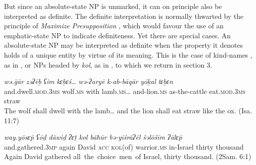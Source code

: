\documentclass[output=paper]{langsci/langscibook}
\begin{document}
But since an absolute-state NP is unmarked, it can on principle also be interpreted as definite. The definite interpretation is normally thwarted by the principle of \textit{Maximize} \textit{Presupposition} \citep{Heim1991}, which would favour the use of an emphatic-state NP to indicate definiteness. Yet there are special cases. An absolute-state NP may be interpreted as definite when the property it denotes holds of a unique entity by virtue of its meaning. This is the case of kind-names \citep{Doron2003}, as in , or NPs headed by \textit{kol}, as in , to which we return in section 3.

\ea%
    \label{ex:doron:5}
    \gll \textit{wə.ḡār}                        \textit{zəʔēḇ}      \textit{ʕim}  \textit{kɛḇɛś…}       \textit{wə-ʔaryē}        \textit{k-ab-bāqār}   \textit{yōḵal}              \textit{tɛḇɛn}\\
         and.dwell.\textsc{mod.3ms}   wolf.\textsc{ms}  with lamb.\textsc{ms}… and-lion\textsc{.ms}   as-the-cattle  eat.\textsc{mod.3ms}  straw\\
    \glt The wolf shall dwell with the lamb… and the lion shall eat straw like the ox. (Isa. 11:7)
    \z


\ea%
    \label{ex:doron:6}
    \gll \textit{way.yōsɛ\={p}              ʕōḏ    dāwiḏ  ʔɛṯ   kol        bāħūr          bə-yiśrāʔēl   šəlōšīm ʔālɛ\={p}}\\
         and.gathered.\textsc{3mp}  again David  \textsc{acc} \textsc{kol}(of) warrior.\textsc{ms} in-Israel      thirty    thousand\\
    \glt Again David gathered all~the~choice~men~of Israel, thirty thousand. (2Sam. 6:1)
    \z

           
\end{document}
